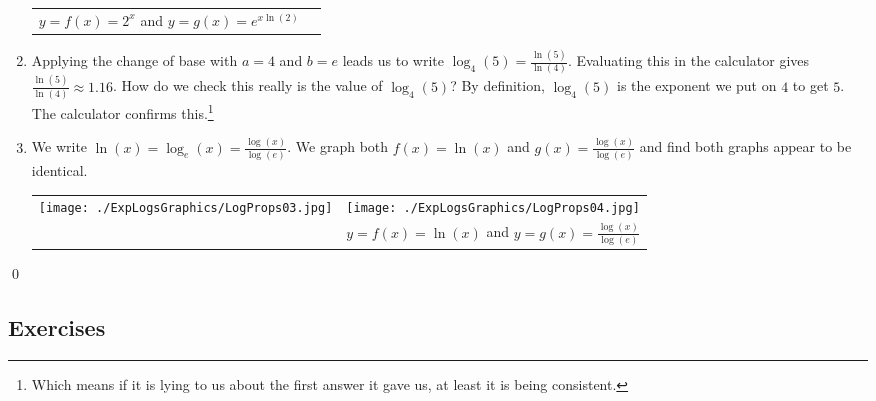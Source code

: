 \begin{ex}
\begin{enumerate}
\begin{center}
\begin{tabular}{cc}
\hspace{1in} $y = f(x) = 2^x$ and $y = g(x) = e^{x \ln(2)}$ \\

\end{tabular}

\end{center}

\item  Applying the change of base with $a=4$ and $b=e$ leads us to write $\log_{4}(5) = \frac{\ln(5)}{\ln(4)}$.  Evaluating this in the calculator gives $\frac{\ln(5)}{\ln(4)} \approx 1.16$.  How do we check this really is the value of $\log_{4}(5)$?  By definition, $\log_{4}(5)$ is the exponent we put on $4$ to get $5$.  The calculator confirms this.\footnote{Which means if it is lying to us about the first answer it gave us, at least it is being consistent.}

\item  We write $\ln(x) = \log_{e}(x) = \frac{\log(x)}{\log(e)}$.  We graph both $f(x) = \ln(x)$ and $g(x) = \frac{\log(x)}{\log(e)}$ and find both graphs appear to be identical.

\begin{center}

\begin{tabular}{cc}

\texttt{[image: ./ExpLogsGraphics/LogProps03.jpg]} &

\hspace{1in} \texttt{[image: ./ExpLogsGraphics/LogProps04.jpg]} \\

 & 

\hspace{1in} $y = f(x) = \ln(x)$ and $y = g(x) = \frac{\log(x)}{\log(e)}$ \\

\end{tabular}

\end{center}

\end{enumerate}

\vspace{-.25in} \qed

\end{ex}

\newpage

\subsection{Exercises}


